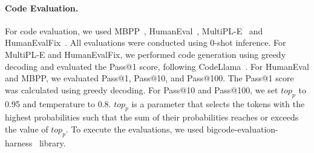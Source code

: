 
\paragraph{Code Evaluation.}

For code evaluation, we used MBPP~\citep{austin2021program}, HumanEval~\citep{chen2021codex}, MultiPL-E~\citep{cassano2022multiple} and HumanEvalFix~\citep{muennighoff2023octopack}. All evaluations were conducted using 0-shot inference. For MultiPL-E and HumanEvalFix, we performed code generation using greedy decoding and evaluated the Pass@1 score, following CodeLlama~\citep{roziere2024code}.  For HumanEval and MBPP, we evaluated Pass@1, Pass@10, and Pass@100. The Pass@1 score was calculated using greedy decoding. For Pass@10 and Pass@100, we set $top_p$ to 0.95 and temperature to 0.8. $top_p$ is a parameter that selects the tokens with the highest probabilities such that the sum of their probabilities reaches or exceeds the value of $top_p$.
% 
% 
To execute the evaluations, we used bigcode-evaluation-harness~\citep{bigcode-evaluation-harness} library. %

\begin{table}[!ht]
\centering
{}
\caption{MultiPL-E evaluation results on different programming languages.}
\label{tab:MultiPL-E}
\end{table}


